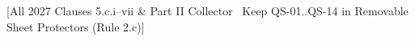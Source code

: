 \vspace{-8pt}
[All 2027 Clauses 5.c.i--vii \& Part II Collector \textbar\ Keep QS-01..QS-14 in Removable Sheet Protectors (Rule 2.c)]
\vspace{-4pt}

